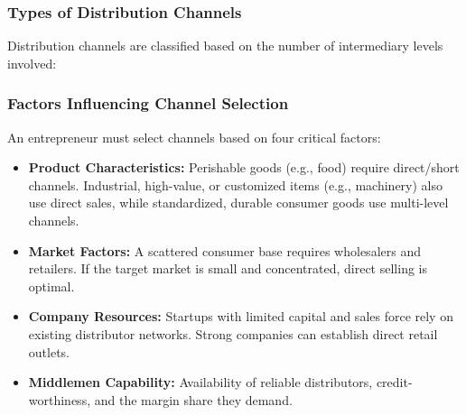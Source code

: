 \documentclass[12pt,a4paper]{article}
\begin{document}
\subsubsection{Types of Distribution Channels}
Distribution channels are classified based on the number of intermediary levels involved:

\begin{tcolorbox}[tikzbox, title={Structure of Distribution Channels}]
\centering
{}
\end{tcolorbox}

\subsubsection{Factors Influencing Channel Selection}
An entrepreneur must select channels based on four critical factors:
\begin{itemize}[leftmargin=*, itemsep=3pt]
  \item \textbf{Product Characteristics:} Perishable goods (e.g., food) require direct/short channels. Industrial, high-value, or customized items (e.g., machinery) also use direct sales, while standardized, durable consumer goods use multi-level channels.
  \item \textbf{Market Factors:} A scattered consumer base requires wholesalers and retailers. If the target market is small and concentrated, direct selling is optimal.
  \item \textbf{Company Resources:} Startups with limited capital and sales force rely on existing distributor networks. Strong companies can establish direct retail outlets.
  \item \textbf{Middlemen Capability:} Availability of reliable distributors, credit-worthiness, and the margin share they demand.
\end{itemize}
\end{document}
